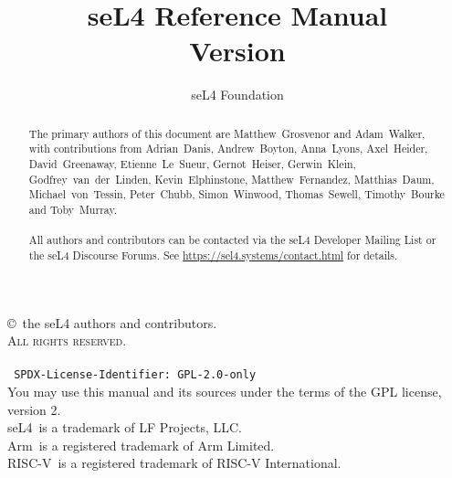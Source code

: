 \documentclass[a4paper,11pt,twoside]{report}
\date{}
\date{}
\newcommand{\version}{}
\begin{document}
  \title{seL4 Reference Manual\\Version \version}

  \author{seL4 Foundation}
  \date{\commitdate}

  \maketitle

  \thispagestyle{empty}

  \vfill

  \copyright\ the seL4 authors and contributors.\\

  \textsc{All rights reserved}.\\
  \\
  \texttt{
    SPDX-License-Identifier: GPL-2.0-only
  }\\
  You may use this manual and its sources under the terms of the GPL license,
  version 2.\\

  seL4\textregistered\ is a trademark of LF Projects, LLC.\\
  Arm\textregistered\ is a registered trademark of Arm Limited.\\
  RISC-V\textregistered\ is a registered trademark of RISC-V International.\\

  \thispagestyle{empty}
  \vfill
  \renewcommand{\abstractname}{Acknowledgements}
  \begin{abstract}
The primary authors of this document are Matthew~Grosvenor and Adam~Walker,
with contributions from
Adrian~Danis,
Andrew~Boyton,
Anna~Lyons,
Axel~Heider,
David~Greenaway,
Etienne~Le~Sueur,
Gernot~Heiser,
Gerwin~Klein,
Godfrey~van~der~Linden,
Kevin~Elphinstone,
Matthew~Fernandez,
Matthias~Daum,
Michael~von~Tessin,
Peter~Chubb,
Simon~Winwood,
Thomas~Sewell,
Timothy~Bourke and
Toby~Murray.
\\
\\
All authors and contributors can be contacted via the seL4 Developer Mailing
List or the seL4 Discourse Forums. See \url{https://sel4.systems/contact.html}
for details.
  \end{abstract}
  \thispagestyle{empty}
\end{document}
